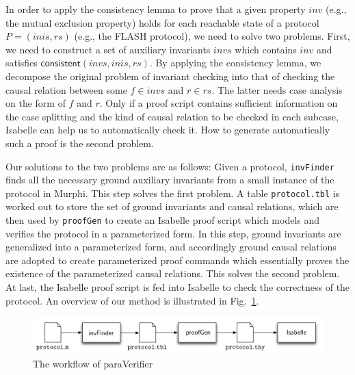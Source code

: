 \documentclass{llncs}
\begin{document}
In order to  apply the consistency lemma to prove that a given property $inv$ (e.g., the mutual exclusion property) holds for each reachable state of a protocol $P=(inis,rs)$ (e.g., the FLASH  protocol), we need to solve two problems. First, we need to construct a set of auxiliary invariants $invs$ which contains $inv$ and satisfies  $\mathsf{consistent}( invs, inis, rs)$.  By applying the consistency lemma, we  decompose the original problem of invariant checking into that of checking the causal relation between some $f\in invs$ and $r \in rs$. The latter needs   case analysis on the form of $f$ and $r$.  Only if a proof script contains sufficient information on the case splitting and  the kind of causal relation to be checked in each subcase, Isabelle can help us to automatically  check it. How to  generate automatically such a proof is the second problem.

Our solutions to the two problems are as follows:
Given a protocol,  \texttt{invFinder} finds all the necessary ground auxiliary invariants from a small instance of the protocol in Murphi. This step solves the first  problem.
 A table {\tt protocol.tbl} is worked out  to store the set of ground invariants and
 causal relations, which are then  used by {\tt proofGen} to
create an Isabelle proof   script which models and verifies the
protocol in a parameterized form. In this step, ground invariants
are generalized into a parameterized form, and accordingly
ground causal relations are adopted to create parameterized
proof commands which essentially proves the existence of the
parameterized causal relations. This solves the second problem.  At last, the Isabelle proof script is
fed into Isabelle to check the correctness of the protocol.
An overview of our method is  illustrated in Fig.~\ref{fig:archParaVerifier}.

\vspace{-10pt}
\begin{figure}[htbp]
\centering %
\includegraphics[width=1\textwidth]{paraVerifier.pdf}
\vspace{-20pt}
\caption{The workflow of {\sf paraVerifier} \label{fig:archParaVerifier}
}
\end{figure}
\vspace{-20pt}
\end{document}
